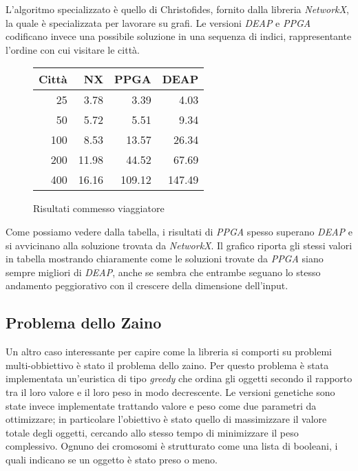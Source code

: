 L'algoritmo specializzato è quello di Christofides, fornito dalla libreria
\textit{NetworkX}, la quale è specializzata per lavorare su grafi. Le versioni
\textit{DEAP} e \textit{PPGA} codificano invece una possibile soluzione in una
sequenza di indici, rappresentante l'ordine con cui visitare le città.

\begin{figure}[H]
	\centering
	\begin{minipage}{0.45\linewidth}
		\centering
		\begin{tabular}{rrrr}
			\toprule
			Città & NX    & PPGA   & DEAP   \\
			\midrule
			25    & 3.78  & 3.39   & 4.03   \\
			50    & 5.72  & 5.51   & 9.34   \\
			100   & 8.53  & 13.57  & 26.34  \\
			200   & 11.98 & 44.52  & 67.69  \\
			400   & 16.16 & 109.12 & 147.49 \\
			\bottomrule
		\end{tabular}
	\end{minipage}
	\hfill
	\begin{minipage}{0.5\linewidth}
		\centering
		
	\end{minipage}
	\caption{Risultati commesso viaggiatore}
	\label{fig: tsp}
\end{figure}

Come possiamo vedere dalla tabella, i risultati di \textit{PPGA} spesso superano
\textit{DEAP} e si avvicinano alla soluzione trovata da \textit{NetworkX}. Il
grafico riporta gli stessi valori in tabella mostrando chiaramente come le
soluzioni trovate da \textit{PPGA} siano sempre migliori di \textit{DEAP}, anche
se sembra che entrambe seguano lo stesso andamento peggiorativo con il crescere
della dimensione dell'input.

\subsection{Problema dello Zaino}

Un altro caso interessante per capire come la libreria si comporti su problemi
multi-obbiettivo è stato il problema dello zaino. Per questo problema è stata
implementata un'euristica di tipo \textit{greedy} che ordina gli oggetti secondo
il rapporto tra il loro valore e il loro peso in modo decrescente. Le versioni
genetiche sono state invece implementate trattando valore e peso come due
parametri da ottimizzare; in particolare l'obiettivo è stato quello di
massimizzare il valore totale degli oggetti, cercando allo stesso tempo di
minimizzare il peso complessivo. Ognuno dei cromosomi è strutturato come una
lista di booleani, i quali indicano se un oggetto è stato preso o meno.


